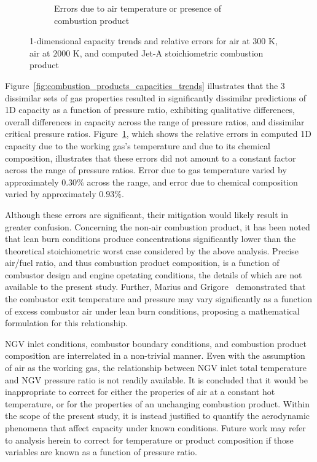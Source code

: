 \documentclass[a4paper, 11pt, oneside]{report}
\begin{document}
\begin{figure}[H]
\begin{subfigure}{.45\textwidth}
		\caption{Errors due to air temperature or presence of combustion product}
		\label{fig:combustion_products_capacities_errors}
	\end{subfigure}
	\caption{1-dimensional capacity trends and relative errors for air at $300$ K, air at $2000$ K, and computed Jet-A stoichiometric combustion product}
	\label{fig:combustion_products_capacities}
\end{figure}

Figure~\ref{fig:combustion_products_capacities_trends} illustrates that the 3 dissimilar sets of gas properties resulted in significantly dissimilar predictions of 1D capacity as a function of pressure ratio, exhibiting qualitative differences, overall differences in capacity across the range of pressure ratios, and dissimilar critical pressure ratios. Figure~\ref{fig:combustion_products_capacities_errors}, which shows the relative errors in computed 1D capacity due to the working gas's temperature and due to its chemical composition, illustrates that these errors did not amount to a constant factor across the range of pressure ratios. Error due to gas temperature varied by approximately $0.30\%$ across the range, and error due to chemical composition varied by approximately $0.93\%$.

Although these errors are significant, their mitigation would likely result in greater confusion. Concerning the non-air combustion product, it has been noted that lean burn conditions produce  concentrations significantly lower than the theoretical stoichiometric worst case considered by the above analysis. Precise air/fuel ratio, and thus combustion product composition, is a function of combustor design and engine opetating conditions, the details of which are not available to the present study. Further, Marius and Grigore~\cite{marius_air_excess} demonstrated that the combustor exit temperature and pressure may vary significantly as a function of excess combustor air under lean burn conditions, proposing a mathematical formulation for this relationship.

NGV inlet conditions, combustor boundary conditions, and combustion product composition are interrelated in a non-trivial manner. Even with the assumption of air as the working gas, the relationship between NGV inlet total temperature and NGV pressure ratio is not readily available. It is concluded that it would be inappropriate to correct for either the properies of air at a constant hot temperature, or for the properties of an unchanging combustion product. Within the scope of the present study, it is instead justified to quantify the aerodynamic phenomena that affect capacity under known conditions. Future work may refer to analysis herein to correct for temperature or product composition if those variables are known as a function of pressure ratio. 
\end{document}
